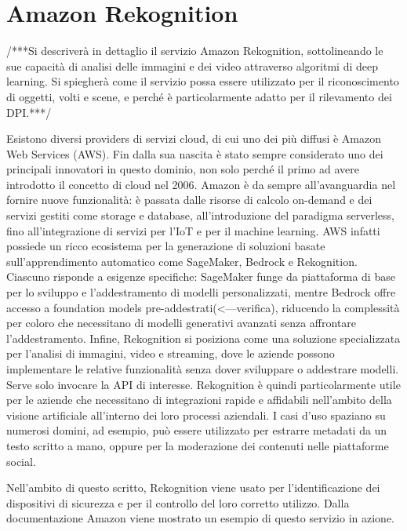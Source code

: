 \section{Amazon Rekognition}

/***Si descriverà in dettaglio il servizio Amazon Rekognition, sottolineando le sue capacità di analisi delle immagini e dei video attraverso algoritmi di deep learning. Si spiegherà come il servizio possa essere utilizzato per il riconoscimento di oggetti, volti e scene, e perché è particolarmente adatto per il rilevamento dei DPI.***/

\noindent Esistono diversi providers di servizi cloud, di cui uno dei più diffusi è Amazon Web Services (AWS). Fin dalla sua nascita è stato sempre considerato uno dei principali innovatori in questo dominio, non solo perché il primo ad avere introdotto il concetto di cloud nel 2006. Amazon è da sempre all'avanguardia nel fornire nuove funzionalità: è passata dalle risorse di calcolo on-demand e dei servizi gestiti come storage e database, all'introduzione del paradigma serverless, fino all'integrazione di servizi per l'IoT e per il machine learning. AWS infatti possiede un ricco ecosistema per la generazione di soluzioni basate sull'apprendimento automatico come SageMaker, Bedrock e Rekognition. Ciascuno risponde a esigenze specifiche: SageMaker funge da piattaforma di base per lo sviluppo e l'addestramento di modelli personalizzati, mentre Bedrock offre accesso a foundation models pre-addestrati(<---verifica), riducendo la complessità per coloro che necessitano di modelli generativi avanzati senza affrontare l’addestramento. Infine, Rekognition si posiziona come una soluzione specializzata per l’analisi di immagini, video e streaming, dove le aziende possono implementare le relative funzionalità senza dover sviluppare o addestrare modelli. Serve solo invocare la API di interesse. Rekognition è quindi particolarmente utile per le aziende che necessitano di integrazioni rapide e affidabili nell'ambito della visione artificiale all'interno dei loro processi aziendali. I casi d'uso spaziano su numerosi domini, ad esempio, può essere utilizzato per estrarre metadati da un testo scritto a mano, oppure per la moderazione dei contenuti nelle piattaforme social.

\noindent Nell'ambito di questo scritto, Rekognition viene usato per l'identificazione dei dispositivi di sicurezza e per il controllo del loro corretto utilizzo. Dalla documentazione Amazon viene mostrato un esempio di questo servizio in azione.

